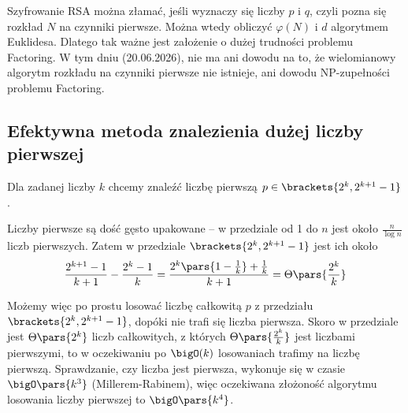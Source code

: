 Szyfrowanie RSA można złamać, jeśli wyznaczy się liczby \( p \) i \( q \), czyli pozna się rozkład \( N \) na czynniki pierwsze.
Można wtedy obliczyć \( \varphi(N) \) i \( d \) algorytmem Euklidesa. Dlatego tak ważne jest założenie o dużej trudności problemu Factoring.
W tym dniu (20.06.2026), nie ma ani dowodu na to, że wielomianowy algorytm rozkładu na czynniki pierwsze nie istnieje, ani dowodu NP-zupełności problemu Factoring.

\subsection{Efektywna metoda znalezienia dużej liczby pierwszej}
Dla zadanej liczby \( k \) chcemy znaleźć liczbę pierwszą \( p \in \brackets{2^k, 2^{k+1}-1} \).

Liczby pierwsze są dość gęsto upakowane -- w przedziale od 1 do \( n \) jest około \( \frac{n}{\log n} \) liczb pierwszych.
Zatem w przedziale \( \brackets{2^k, 2^{k+1}-1} \) jest ich około
\[
	\frac{2^{k+1} - 1}{k+1} - \frac{2^{k} - 1}{k} = \frac{2^k\pars{1-\frac{1}{k}} + \frac{1}{k}}{k+1} = \Theta\pars{\frac{2^k}{k}}
\]

Możemy więc po prostu losować liczbę całkowitą \( p \) z przedziału \( \brackets{2^k, 2^{k+1}-1} \), dopóki nie trafi się liczba pierwsza.
Skoro w przedziale jest \( \Theta\pars{2^k} \) liczb całkowitych, z których \( \Theta\pars{\frac{2^k}{k}} \) jest liczbami pierwszymi, to w oczekiwaniu po \( \bigO(k) \) losowaniach trafimy na liczbę pierwszą.
Sprawdzanie, czy liczba jest pierwsza, wykonuje się w czasie \( \bigO\pars{k^3} \) (Millerem-Rabinem), więc oczekiwana złożoność algorytmu losowania liczby pierwszej to \( \bigO\pars{k^4} \).